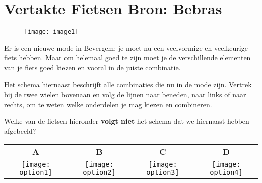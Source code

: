 \documentclass[12pt, a4paper]{article}
\begin{document}
	\begin{minipage}{\textwidth}
		\section{Vertakte Fietsen \hfill\small Bron: Bebras}
			\begin{wrapfigure}{r}{0.42\textwidth} 
				\texttt{[image: image1]}
			\end{wrapfigure}
			Er is een nieuwe mode in Bevergem: je moet nu een veelvormige en veelkeurige fiets hebben. Maar om helemaal goed te zijn moet je de verschillende elementen van je fiets goed kiezen en vooral in de juiste combinatie.
			
			Het schema hiernaast beschrijft alle combinaties die nu in de mode zijn. Vertrek bij de twee wielen bovenaan en volg de lijnen naar beneden, naar links of naar rechts, om te weten welke onderdelen je mag kiezen en combineren.
			
			Welke van de fietsen hieronder \textbf{volgt niet} het schema dat we hiernaast hebben afgebeeld?
			\vspace{0.5cm}
			
			\begin{table}[H]
				\begin{tabulary}{\linewidth}{|C|C|C|C|}
					\hline
					\textbf{A} & \textbf{B} & \textbf{C} & \textbf{D} \\
					\texttt{[image: option1]} &
					\texttt{[image: option2]} &
					\texttt{[image: option3]} &
					\texttt{[image: option4]} \\
					\hline 
				\end{tabulary}
			\end{table}
	\end{minipage} \\ \\
		
\end{document}
